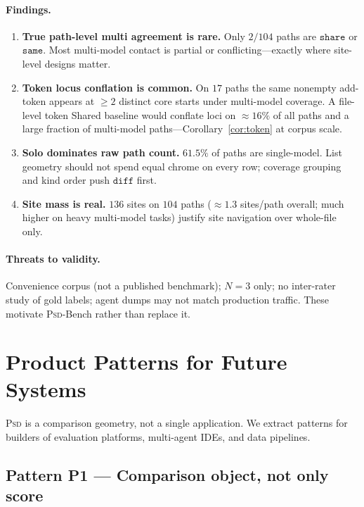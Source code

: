 \documentclass[
  11pt,
  a4paper,
  oneside,
  numbers=noenddot,
  abstract=true,
  headings=normal,
  DIV=11,
  BCOR=0mm,
]{scrartcl}
\theoremstyle{definition}
\theoremstyle{plain}
\theoremstyle{remark}
\newcommand{\PSD}{\textsc{Psd}}
\newcommand{\badge}[1]{\texttt{#1}}
\begin{document}
\paragraph{Findings.}

\begin{enumerate}
  \item \textbf{True path-level multi agreement is rare.} Only $2/104$
        paths are $\badge{share}$ or $\badge{same}$. Most multi-model
        contact is partial or conflicting---exactly where site-level
        designs matter.
  \item \textbf{Token locus conflation is common.} On $17$ paths the same
        nonempty add-token appears at $\ge 2$ distinct core starts under
        multi-model coverage. A file-level token Shared baseline would
        conflate loci on $\approx 16\%$ of all paths and a large fraction
        of multi-model paths---Corollary~\ref{cor:token} at corpus scale.
  \item \textbf{Solo dominates raw path count.} $61.5\%$ of paths are
        single-model. List geometry should not spend equal chrome on every
        row; coverage grouping and kind order push $\badge{diff}$ first.
  \item \textbf{Site mass is real.} $136$ sites on $104$ paths
        ($\approx 1.3$ sites/path overall; much higher on heavy
        multi-model tasks) justify site navigation over whole-file only.
\end{enumerate}

\paragraph{Threats to validity.}
Convenience corpus (not a published benchmark); $N=3$ only; no inter-rater
study of gold labels; agent dumps may not match production traffic. These
motivate \PSD{}-Bench rather than replace it.

\section{Product Patterns for Future Systems}
\label{sec:products}

\PSD{} is a comparison geometry, not a single application. We extract
patterns for builders of evaluation platforms, multi-agent IDEs, and data
pipelines.

\subsection{Pattern P1 --- Comparison object, not only score}
\end{document}
